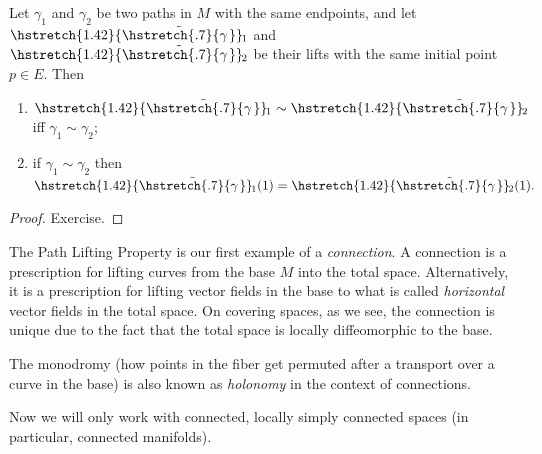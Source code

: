 \documentclass[english,letterpaper]{article}%
\numberwithin{equation}{section}
\numberwithin{figure}{section}
\numberwithin{table}{section}
\theoremstyle{definition}
\theoremstyle{definition}
\theoremstyle{definition}
\theoremstyle{plain}
\theoremstyle{plain}
\theoremstyle{plain}
\theoremstyle{plain}
\theoremstyle{remark}
\theoremstyle{remark}
\def\red{\color{red}}
\newcommand{\PRLsep}{   %
           \noindent\makebox[\linewidth]{
                \resizebox{0.5\linewidth}{1pt}{$\blacklozenge$}}}
\newcommand\wt[1]{\hstretch{1.42}{\tilde{\hstretch{.7}{#1\mkern2mu}}}\mkern-2mu}
\begin{document}
\begin{thm}
Let $\gamma_1$ and $\gamma_2$ be two paths in $M$ with the same endpoints, and let $\wt\gamma_1$ and $\wt\gamma_2$ be their lifts with the same initial point $p\in E$. Then
\begin{enumerate}
    \item $\wt\gamma_1\sim\wt\gamma_2$ iff $\gamma_1\sim\gamma_2$;
    \item if $\gamma_1\sim\gamma_2$ then $\wt\gamma_1(1)=\wt\gamma_2(1).$
\end{enumerate}
\end{thm}
\begin{proof}
Exercise.
\end{proof}


\begin{rem}\label{covering spaces and connections}
	The Path Lifting Property is our first example of a \emph{connection}. A connection is a prescription for lifting curves from the base $M$ into the total space. Alternatively, it is a prescription for lifting vector fields in the base to what is called \emph{horizontal} vector fields in the total space. On covering spaces, as we see, the connection is unique due to the fact that the total space is locally diffeomorphic to the base.
	
	The monodromy (how points in the fiber get permuted after a transport over a curve in the base) is also known as \emph{holonomy} in the context of connections.
\end{rem}

Now we will only work with connected, locally simply connected spaces (in particular, connected manifolds).
\end{document}
